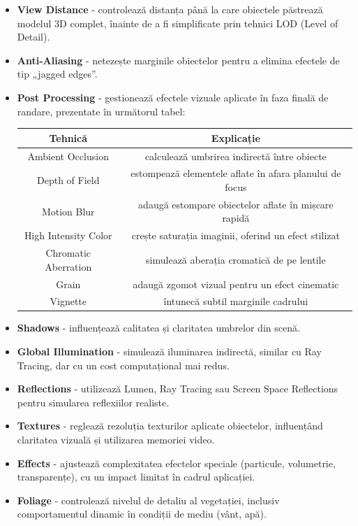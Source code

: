 \begin{itemize}
\item \textbf{View Distance} - controlează distanța până la care obiectele păstrează modelul 3D complet, înainte de a fi simplificate prin tehnici LOD (Level of Detail).
\item \textbf{Anti-Aliasing} - netezește marginile obiectelor pentru a elimina efectele de tip „jagged edges”.
\item \textbf{Post Processing} - gestionează efectele vizuale aplicate în faza finală de randare, prezentate în următorul tabel:
\begin{center}
\begin{tabular}{||c c||} 
 \hline
 Tehnică & Explicație \\ [0.5ex] 
 \hline\hline
 Ambient Occlusion & calculează umbrirea indirectă între obiecte \\ 
 \hline
 Depth of Field & estompează elementele aflate în afara planului de focus \\
 \hline
 Motion Blur & adaugă estompare obiectelor aflate în mișcare rapidă \\
 \hline
 High Intensity Color & crește saturația imaginii, oferind un efect stilizat  \\ [1ex] 
 \hline
 Chromatic Aberration & simulează aberația cromatică de pe lentile  \\ [1ex] 
 \hline
 Grain & adaugă zgomot vizual pentru un efect cinematic  \\ [1ex] 
 \hline
 Vignette & întunecă subtil marginile cadrului  \\ [1ex] 
 \hline
\end{tabular}
\end{center}

\item \textbf{Shadows} - influențează calitatea și claritatea umbrelor din scenă.
\item \textbf{Global Illumination} - simulează iluminarea indirectă, similar cu Ray Tracing, dar cu un cost computațional mai redus.
\item \textbf{Reflections} - utilizează Lumen, Ray Tracing sau Screen Space Reflections pentru simularea reflexiilor realiste.
\item \textbf{Textures} - reglează rezoluția texturilor aplicate obiectelor, influențând claritatea vizuală și utilizarea memoriei video.
\item \textbf{Effects} - ajustează complexitatea efectelor speciale (particule, volumetrie, transparențe), cu un impact limitat în cadrul aplicației.
\item \textbf{Foliage} - controlează nivelul de detaliu al vegetației, inclusiv comportamentul dinamic în condiții de mediu (vânt, apă).

\end{itemize}

